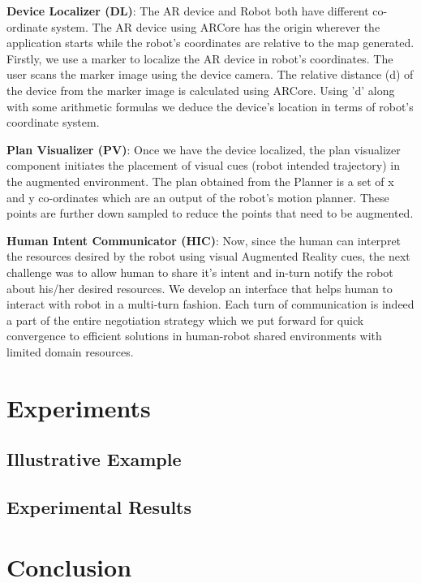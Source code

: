\documentclass{article}
\begin{document}
{\bf Device Localizer (DL)}: The AR device and Robot both have different co-ordinate system. The AR device using ARCore has the origin wherever the application starts while the robot’s coordinates are relative to the map generated.  Firstly, we use a marker to localize the AR device in robot’s coordinates. The user scans the marker image using the device camera. The relative distance (d) of the device from the marker image is calculated using ARCore. Using 'd' along with some arithmetic formulas we deduce the device's location in terms of robot's coordinate system.

{\bf Plan Visualizer (PV)}: Once we have the device localized, the plan visualizer component initiates the placement of visual cues (robot intended trajectory) in the augmented environment. The plan obtained from the Planner is a set of x and y co-ordinates which are an output of the robot's motion planner. These points are further down sampled to reduce the points that need to be augmented. 

{\bf Human Intent Communicator (HIC)}: Now, since the human can interpret the resources desired by the robot using visual Augmented Reality cues, the next challenge was to allow human to share it's intent and in-turn notify the robot about his/her desired resources. We develop an interface that helps human to interact with robot in a multi-turn fashion. Each turn of communication is indeed a part of the entire negotiation strategy which we put forward for quick convergence to efficient solutions in human-robot shared environments with limited domain resources.


\section{Experiments}
\subsection{Illustrative Example}

\subsection{Experimental Results}

\section{Conclusion}

\appendix




\end{document}
